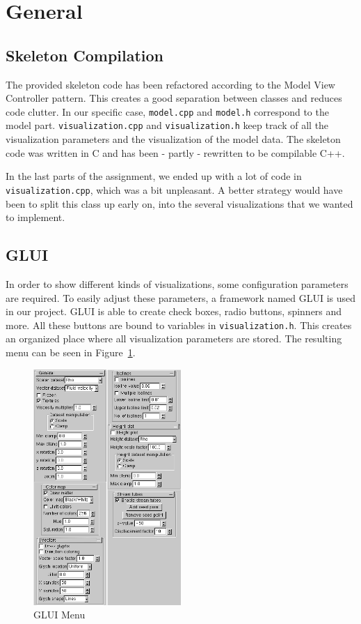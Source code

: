 \section{General}
	\label{sec:general}

	\subsection{Skeleton Compilation}
    The provided skeleton code has been refactored according to the Model View Controller pattern. This creates a good separation between classes and reduces code clutter.
    In our specific case, \texttt{model.cpp} and \texttt{model.h} correspond to the model part. \texttt{visualization.cpp} and \texttt{visualization.h} keep track of all the visualization parameters and the visualization of the model data.
    The skeleton code was written in C and has been - partly - rewritten to be compilable C++.

    In the last parts of the assignment, we ended up with a lot of code in \texttt{visualization.cpp}, which was a bit unpleasant.
    A better strategy would have been to split this class up early on, into the several visualizations that we wanted to implement.

    \subsection{GLUI}
        In order to show different kinds of visualizations, some configuration parameters are required.
        To easily adjust these parameters, a framework named GLUI \cite{glui} is used in our project.
        GLUI is able to create check boxes, radio buttons, spinners and more.
        All these buttons are bound to variables in \texttt{visualization.h}.
        This creates an organized place where all visualization parameters are stored.
        The resulting menu can be seen in Figure~\ref{fig:menu}.
        \begin{figure}[htb]
            \centering
            \includegraphics[width =0.5\textwidth]{content/pictures/menu.png}
            \caption{GLUI Menu}
            \label{fig:menu}
        \end{figure}